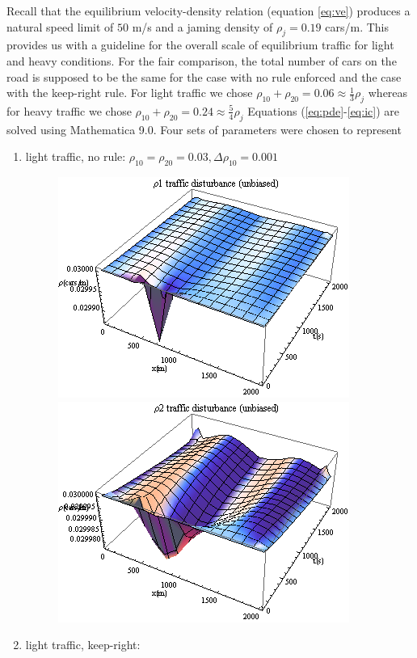 	Recall that the equilibrium velocity-density relation (equation \ref{eq:ve}) produces a natural speed limit of $50$ m/s and a jaming density of $\rho_j=0.19$ cars/m. This provides us with a guideline for the overall scale of equilibrium traffic for light and heavy conditions. For the fair comparison, the total number of cars on the road is supposed to be the same for the case with no rule enforced and the case with the keep-right rule. For light traffic we chose $\rho_{10}+\rho_{20}=0.06 \approx \frac{1}{3}\rho_j$ whereas for heavy traffic we chose $\rho_{10}+\rho_{20}=0.24 \approx \frac{5}{4}\rho_j$
	Equations (\ref{eq:pde}-\ref{eq:ic}) are solved using Mathematica 9.0. Four sets of parameters were chosen to represent
	\begin{enumerate}
	\item{light traffic, no rule:}
		$\rho_{10}=\rho_{20}=0.03, \Delta \rho_{10}=0.001$
		\begin{figure}[h]
		\includegraphics[scale=.6]{plot/p1_light_disturb_unbiased}
		\includegraphics[scale=.6]{plot/p2_light_disturb_unbiased}
		\end{figure}
	\item{light traffic, keep-right:}

\end{enumerate}
